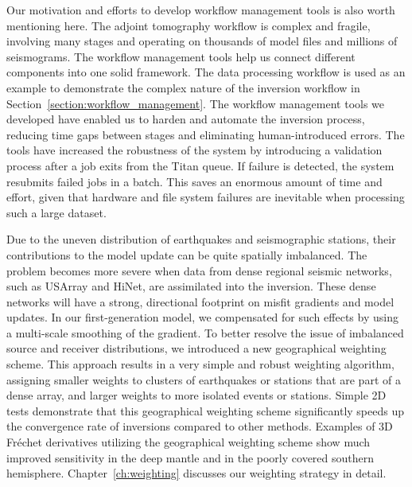 Our motivation and efforts to develop workflow management tools is also worth mentioning here.
The adjoint tomography workflow is complex and fragile, involving many stages and operating
on thousands of model files and millions of seismograms.
The workflow management tools help us connect different components into one solid
framework.
The data processing workflow is used as an example to demonstrate the complex
nature of the inversion workflow
in Section~\ref{section:workflow_management}.
The workflow management tools we developed have enabled us to harden and automate the inversion process,
reducing time gaps between stages and eliminating human-introduced errors.
The tools have increased the robustness of the system by introducing
a validation process after a job exits from the Titan queue.
If failure is detected, the system resubmits failed jobs in a batch.
This saves an enormous amount of time and effort,
given that hardware and file system failures are inevitable when processing such a large dataset.

Due to the uneven distribution of earthquakes and seismographic stations,
their contributions to the model update can be quite spatially imbalanced.
The problem becomes more severe when data from dense regional seismic networks, such as USArray and HiNet,
are assimilated into the inversion.
These dense networks will have a strong, directional footprint on misfit gradients and
model updates.
In our first-generation model,
we compensated for such effects by using a multi-scale smoothing of the gradient.
To better resolve the issue of imbalanced source and receiver distributions,
we introduced a new geographical weighting scheme.
This approach results in a very simple and robust weighting algorithm,
assigning smaller weights to clusters of earthquakes or stations that are part of a dense array, and larger weights to more isolated events or stations.
Simple 2D tests demonstrate that this geographical weighting scheme significantly speeds up the
convergence rate of inversions compared to other methods.
Examples of 3D Fr\'echet derivatives utilizing the geographical weighting scheme show
much improved sensitivity in the deep mantle and in the poorly covered southern hemisphere.
Chapter~\ref{ch:weighting} discusses our weighting strategy in detail.

